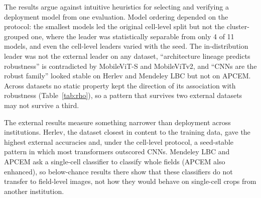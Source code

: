 \documentclass[12pt,letterpaper]{article}
\begin{document}
The results argue against intuitive heuristics for selecting and verifying a deployment model from one evaluation. Model ordering depended on the protocol: the smallest models led the original cell-level split but not the cluster-grouped one, where the leader was statistically separable from only 4 of 11 models, and even the cell-level leaders varied with the seed. The in-distribution leader was not the external leader on any dataset, ``architecture lineage predicts robustness'' is contradicted by MobileViT-S and MobileViTv2, and ``CNNs are the robust family'' looked stable on Herlev and Mendeley LBC but not on APCEM. Across datasets no static property kept the direction of its association with robustness (Table~\ref{tab:rho}), so a pattern that survives two external datasets may not survive a third.

The external results measure something narrower than deployment across institutions. Herlev, the dataset closest in content to the training data, gave the highest external accuracies and, under the cell-level protocol, a seed-stable pattern in which most transformers outscored CNNs. Mendeley LBC and APCEM ask a single-cell classifier to classify whole fields (APCEM also enhanced), so below-chance results there show that these classifiers do not transfer to field-level images, not how they would behave on single-cell crops from another institution.
\end{document}
